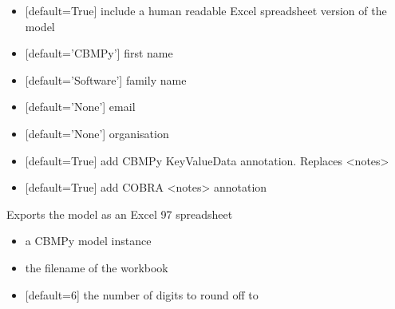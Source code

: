 \documentclass[letterpaper,10pt,english]{sphinxmanual}
\begin{document}
\begin{fulllineitems}
\begin{itemize}
\item {} 
\sphinxAtStartPar
{} {[}default=True{]} include a human readable Excel spreadsheet version of the model

\item {} 
\sphinxAtStartPar
{} {[}default=’CBMPy’{]} first name

\item {} 
\sphinxAtStartPar
{} {[}default=’Software’{]} family name

\item {} 
\sphinxAtStartPar
{} {[}default=’None’{]} email

\item {} 
\sphinxAtStartPar
{} {[}default=’None’{]} organisation

\item {} 
\sphinxAtStartPar
{} {[}default=True{]} add CBMPy KeyValueData annotation. Replaces \textless{}notes\textgreater{}

\item {} 
\sphinxAtStartPar
{} {[}default=True{]} add COBRA \textless{}notes\textgreater{} annotation

\end{itemize}

\end{fulllineitems}


\begin{fulllineitems}
\label{\detokenize{modules_doc:cbmpy.CBWrite.writeModelToExcel97}}
\pysigstartsignatures
{}
\pysigstopsignatures
\sphinxAtStartPar
Exports the model as an Excel 97 spreadsheet
\begin{itemize}
\item {} 
\sphinxAtStartPar
{} a CBMPy model instance

\item {} 
\sphinxAtStartPar
{} the filename of the workbook

\item {} 
\sphinxAtStartPar
{} {[}default=6{]} the number of digits to round off to

\end{itemize}

\end{fulllineitems}
\end{document}
